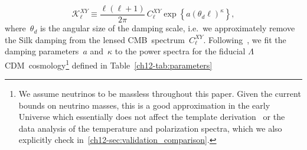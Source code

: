 \begin{equation}
	\mathcal{K}_\ell^{XY} \equiv \frac{\ell(\ell+1)}{2\pi}\, C_\ell^{XY} \exp\left\{a(\theta_d\ell)^\kappa \right\},	\label{ch12-eq:K_ell}
\end{equation}
where~$\theta_d$ is the angular size of the damping scale, i.e.\ we approximately remove the Silk damping from the lensed CMB~spectrum~$C_\ell^{XY}$. Following~\cite{Wallisch:2018rzj}, we fit the damping parameters~$a$ and~$\kappa$ to the power spectra for the fiducial $\Lambda$CDM~cosmology\hskip1pt\footnote{We assume neutrinos to be massless throughout this paper. Given the current bounds on neutrino masses, this is a good approximation in the early Universe which essentially does not affect the template derivation~\cite{Imig:priv} or the data analysis of the temperature and polarization spectra, which we also explicitly check in~\textsection\ref{ch12-sec:validation_comparison}.} defined in Table~\ref{ch12-tab:parameters}%
